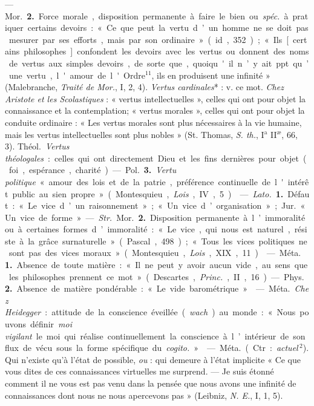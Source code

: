 \begin{itemize}[leftmargin=1cm, label=, itemsep=1pt]
— \si{Mor.}  {\bf 2.} Force morale, disposition permanente à faire le bien ou
{\it spéc.} à pratiquer certains devoirs : « Ce que peut la vertu d’un homme
ne se doit pas mesurer par ses efforts, mais par son ordinaire » (id., 352) ;
« Ils [certains philosophes] confondent les devoirs avec les vertus ou
donnent des noms de vertus aux simples devoirs, de sorte que, quoiqu'il n’y
ait ppt. qu’une vertu, l'amour de l'Ordre$^{11}$, ils en produisent une
infinité » (Malebranche, {\it Traité de Mor.}, I, 2, 4). {\it Vertus
cardinales}* : v. ce mot. {\it Chez Aristote et les Scolastiques} : « vertus
intellectuelles », celles qui ont pour objet la connaissance et la
contemplation; « vertus morales », celles qui ont pour objet la conduite
ordinaire : « Les vertus morales sont plus nécessaires à la vie humaine, mais
les vertus intellectuelles sont plus nobles » (St. Thomas, {\it S. th.},
I$^\text{a}$ II$^\text{æ}$, 66, 3). \si{Théol.} {\it Vertus théologales} :
celles qui ont directement Dieu et les fins dernières pour objet (foi,
espérance, charité).

— \si{Pol.} {\bf 3.} {\it Vertu politique} « amour des lois et de la
patrie,... préférence continuelle de l'intérêt public au sien propre
» (Montesquieu, {\it Lois}, IV, 5).

 — {\it Lato.} {\bf 1.} Défaut : « Le vice d’un
raisonnement »; « Un vice d’organisation »; \si{Jur.} « Un vice de forme ».

— {\it Str.} \si{Mor.}  {\bf 2.} Disposition permanente à l’immoralité ou à
certaines formes d’immoralité : « Le vice, qui nous est naturel, résiste à la
grâce surnaturelle » (Pascal, 498) ; « Tous les vices politiques ne sont pas
des vices moraux » (Montesquieu, {\it Lois}, XIX, 11).

 — \si{Méta.} {\bf 1.} Absence de toute matière : « Il ne peut y
avoir aucun vide, au sens que les philosophes prennent ce mot » (Descartes,
{\it Princ.}, II, 16). — \si{Phys.}  {\bf 2.} Absence de matière pondérable :
« Le vide barométrique. »

 — \si{Méta.} {\it Chez Heidegger} : attitude de la conscience
éveillée ({\it wach}) au monde : « Nous pouvons définir {\it moi vigilant} le
moi qui réalise continuellement la conscience à l’intérieur de son flux de
vécu sous la forme spécifique du {\it cogito.} »

 — \si{Méta.} (Ctr. : {\it actuel}$\,^2$). Qui n'existe qu’à l’état
de possible, {\it ou} : qui demeure à l’état implicite « Ce que vous dites de
ces connaissances virtuelles me surprend. — Je suis étonné comment il ne vous
est pas venu dans la pensée que nous avons une infinité de connaissances dont
nous ne nous apercevons pas » (Leibniz, {\it N. E.}, I, 1, 5).


\end{itemize}
